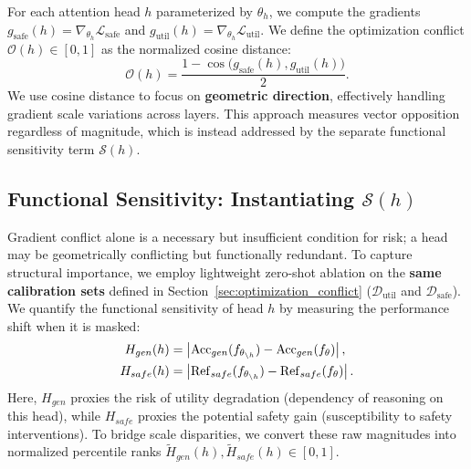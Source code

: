 \documentclass[11pt]{article}
\begin{document}
For each attention head $h$ parameterized by $\theta_h$, we compute the gradients $g_{\text{safe}}(h) = \nabla_{\theta_h} \mathcal{L}_{\text{safe}}$ and $g_{\text{util}}(h) = \nabla_{\theta_h} \mathcal{L}_{\text{util}}$. We define the optimization conflict $\mathcal{O}(h) \in [0, 1]$ as the normalized cosine distance:
\begin{equation}
    \mathcal{O}(h) = \frac{1 - \cos\big(g_{\text{safe}}(h), g_{\text{util}}(h)\big)}{2}.
\end{equation}
We use cosine distance to focus on \textbf{geometric direction}, effectively handling gradient scale variations across layers. This approach measures vector opposition regardless of magnitude, which is instead addressed by the separate functional sensitivity term $\mathcal{S}(h)$.

\subsection{Functional Sensitivity: Instantiating $\mathcal{S}(h)$}
Gradient conflict alone is a necessary but insufficient condition for risk; a head may be geometrically conflicting but functionally redundant. To capture structural importance, we employ lightweight zero-shot ablation on the \textbf{same calibration sets} defined in Section~\ref{sec:optimization_conflict} ($\mathcal{D}_{\text{util}}$ and $\mathcal{D}_{\text{safe}}$). We quantify the functional sensitivity of head $h$ by measuring the performance shift when it is masked:
{
\begin{align}
    H_{gen}(h) &= \left| \mathrm{Acc}_{gen}(f_{\theta_{\setminus h}}) - \mathrm{Acc}_{gen}(f_{\theta}) \right|, \\
    H_{safe}(h) &= \left| \mathrm{Ref}_{safe}(f_{\theta_{\setminus h}}) - \mathrm{Ref}_{safe}(f_{\theta}) \right|.
    \raisetag{20pt} 
\end{align}
}
Here, $H_{gen}$ proxies the risk of utility degradation (dependency of reasoning on this head), while $H_{safe}$ proxies the potential safety gain (susceptibility to safety interventions). To bridge scale disparities, we convert these raw magnitudes into normalized percentile ranks $\tilde H_{gen}(h), \tilde H_{safe}(h) \in [0, 1]$.
\end{document}
